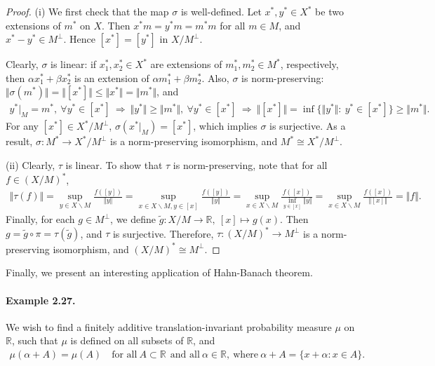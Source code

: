 \documentclass{article}
\begin{document}
\begin{proof}
(i) We first check that the map $\sigma$ is well-defined. Let $x^*,y^*\in X^*$ be two extensions of $m^*$ on $X$. Then $x^*m=y^*m = m^*m$ for all $m\in M$, and $x^*-y^*\in M^\perp$. Hence $[x^*]=[y^*]$ in $X/ M^\perp$.
\vspace{0.1cm}

Clearly, $\sigma$ is linear: if $x_1^*,x_2^*\in X^*$ are extensions of $m_1^*,m_2^*\in M^*$, respectively, then $\alpha x_1^* + \beta x_2^*$ is an extension of $\alpha m_1^* + \beta m_2^*$. Also, $\sigma$ is norm-preserving: $\Vert \sigma(m^*)\Vert = \Vert[x^*]\Vert \leq \Vert x^*\Vert = \Vert m^*\Vert$, and
\begin{align*}
	y^*|_M=m^*,\ \forall y^*\in[x^*]\ \Rightarrow\ \Vert y^*\Vert \geq \Vert m^*\Vert,\ \forall y^*\in[x^*]\ \Rightarrow\ \Vert[x^*]\Vert = \inf\{\Vert y^*\Vert:\ y^*\in [x^*]\} \geq \Vert m^*\Vert.
\end{align*}
For any $[x^*]\in X^*/M^\perp$, $\sigma(x^*|_M)=[x^*]$, which implies $\sigma$ is surjective. As a result, $\sigma:M^*\to X^*/M^\perp$ is a norm-preserving isomorphism, and $M^*\cong X^*/M^\perp$.
\vspace{0.1cm}

(ii) Clearly, $\tau$ is linear. To show that $\tau$ is norm-preserving, note that for all $f\in (X/M)^*$,
\begin{align*}
	\Vert\tau(f)\Vert = \sup_{y\in X\backslash M}\frac{f([y])}{\Vert y\Vert} = \sup_{x\in X\backslash M,y\in[x]}\frac{f([y])}{\Vert y\Vert} = \sup_{x\in X\backslash M}\frac{f([x])}{\inf_{y\in[x]}\Vert y\Vert} = \sup_{x\in X\backslash M}\frac{f([x])}{\Vert [x]\Vert} = \Vert f\Vert.
\end{align*}
Finally, for each $g\in M^\perp$, we define $\tilde{g}:X/M\to\mathbb{R},\ [x]\mapsto g(x)$. Then $g=\tilde{g}\circ\pi = \tau(\tilde{g})$, and $\tau$ is surjective. Therefore, $\tau:(X/M)^*\to M^\perp$ is a norm-preserving isomorphism, and $(X/M)^*\cong M^\perp$.
\end{proof}

Finally, we present an interesting application of Hahn-Banach theorem.
\paragraph{Example 2.27.\label{example:2.27}} We wish to find a finitely additive translation-invariant probability measure $\mu$ on $\mathbb{R}$, such that $\mu$ is defined on all subsets of $\mathbb{R}$, and
\begin{align*}
	\mu(\alpha + A) = \mu(A)\quad \text{for all}\ A\subset\mathbb{R}\ \ \text{and all}\ \alpha\in\mathbb{R},\ \text{where}\ \alpha+A=\{x+\alpha:x\in A\}.
\end{align*}
\end{document}
